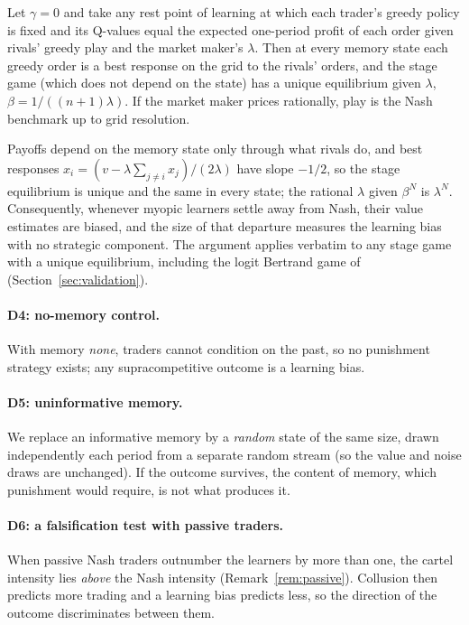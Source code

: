 \begin{proposition}\label{prop:myopic}
Let $\gamma=0$ and take any rest point of learning at which each trader's
greedy policy is fixed and its Q-values equal the expected one-period profit
of each order given rivals' greedy play and the market maker's $\lambda$.
Then at every memory state each greedy order is a best response on the grid
to the rivals' orders, and the stage game (which does not depend on the
state) has a unique equilibrium given $\lambda$, $\beta=1/((n+1)\lambda)$.
If the market maker prices rationally, play is the Nash benchmark up to grid
resolution.
\end{proposition}

\noindent Payoffs depend on the memory state only through what rivals do, and
best responses $x_i=(v-\lambda\sum_{j\ne i}x_j)/(2\lambda)$ have slope
$-1/2$, so the stage equilibrium is unique and the same in every state; the
rational $\lambda$ given $\beta^N$ is $\lambda^N$. Consequently, whenever
myopic learners settle away from Nash, their value estimates are biased, and
the size of that departure measures the learning bias with no strategic
component. The argument applies verbatim to any stage game with a unique
equilibrium, including the logit Bertrand game of \citet{calvano2020}
(Section~\ref{sec:validation}).

\paragraph{D4: no-memory control.} With memory \emph{none}, traders cannot
condition on the past, so no punishment strategy exists; any supracompetitive
outcome is a learning bias.

\paragraph{D5: uninformative memory.} We replace an informative memory by a
\emph{random} state of the same size, drawn independently each period from a
separate random stream (so the value and noise draws are unchanged). If the
outcome survives, the content of memory, which punishment would require, is
not what produces it.

\paragraph{D6: a falsification test with passive traders.} When passive Nash
traders outnumber the learners by more than one, the cartel intensity lies
\emph{above} the Nash intensity (Remark~\ref{rem:passive}). Collusion then predicts more
trading and a learning bias predicts less, so the direction of the outcome
discriminates between them.

